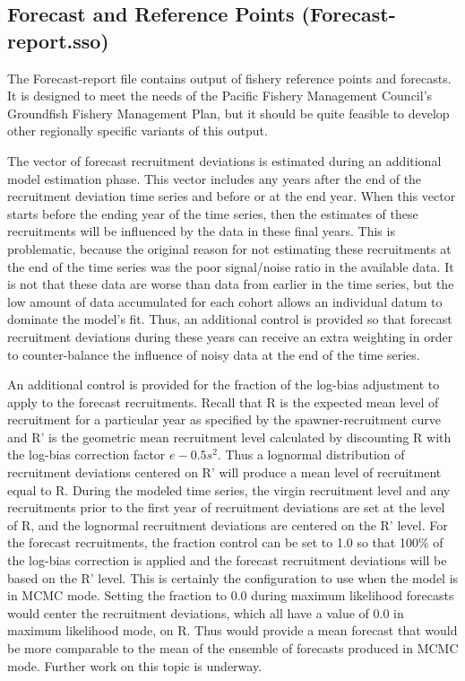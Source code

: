 \subsection{Forecast and Reference Points (Forecast-report.sso)}
The Forecast-report file contains output of fishery reference points and forecasts. It is designed to meet the needs of the Pacific Fishery Management Council's Groundfish Fishery Management Plan, but it should be quite feasible to develop other regionally specific variants of this output.

The vector of forecast recruitment deviations is estimated during an additional model estimation phase. This vector includes any years after the end of the recruitment deviation time series and before or at the end year. When this vector starts before the ending year of the time series, then the estimates of these recruitments will be influenced by the data in these final years. This is problematic, because the original reason for not estimating these recruitments at the end of the time series was the poor signal/noise ratio in the available data. It is not that these data are worse than data from earlier in the time series, but the low amount of data accumulated for each cohort allows an individual datum to dominate the model's fit. Thus, an additional control is provided so that forecast recruitment deviations during these years can receive an extra weighting in order to counter-balance the influence of noisy data at the end of the time series.

An additional control is provided for the fraction of the log-bias adjustment to apply to the forecast recruitments. Recall that R is the expected mean level of recruitment for a particular year as specified by the spawner-recruitment curve and R' is the geometric mean recruitment level calculated by discounting R with the log-bias correction factor $e-0.5s^2$. Thus a lognormal distribution of recruitment deviations centered on R' will produce a mean level of recruitment equal to R. During the modeled time series, the virgin recruitment level and any recruitments prior to the first year of recruitment deviations are set at the level of R, and the lognormal recruitment deviations are centered on the R' level. For the forecast recruitments, the fraction control can be set to 1.0 so that 100\% of the log-bias correction is applied and the forecast recruitment deviations will be based on the R' level. This is certainly the configuration to use when the model is in MCMC mode. Setting the fraction to 0.0 during maximum likelihood forecasts would center the recruitment deviations, which all have a value of 0.0 in maximum likelihood mode, on R. Thus would provide a mean forecast that would be more comparable to the mean of the ensemble of forecasts produced in MCMC mode.  Further work on this topic is underway.

